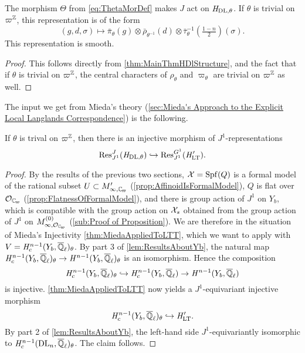 \documentclass[../main.tex]{subfiles}
\begin{document}
\begin{lem}
  The morphism $\Theta$ from \eqref{eq:ThetaMorDef} makes $J$ act on
  ${\mathit H}_{\mathrm{DL},\theta}$. If $\theta$ is trivial on $\varpi^{\mathbb{Z}}$, this
  representation is of the form 
  \begin{equation*}
    (g,d,\sigma) \mapsto \bar \pi_\theta(g) \otimes \bar \rho_{\theta^{-1}}(d)
    \otimes \bar \tau_\theta^{-1}(\tfrac{1-n}2)(\sigma).
  \end{equation*}
  This representation is smooth.
\begin{proof}
  This follows directly from \cref{thm:MainThmHDlStructure}, and the fact that 
  if $\theta$ is trivial on $\varpi^{\mathbb{Z}}$, the central characters of $\rho_\theta$
  and $\varpi_\theta$ are trivial on $\varpi^{\mathbb{Z}}$ as well. 
\end{proof}
\end{lem}

The input we get from Mieda's theory (\cref{sec:Mieda's Approach
to the Explicit Local Langlands Correspondence}) is the
following.
\begin{prop}\label{prop:J1EquivInjMor}
  If $\theta$ is trival on $\varpi^{\mathbb{Z}}$, then there is an injective morphism of
  $J^1$-representations
  \begin{equation*} 
    \operatorname{Res}_{J^1}^J( \mathit H_{\mathrm{DL},\theta} ) \hookrightarrow \operatorname{Res}_{J^1}^{G^1}( \mathit H'_{\mathrm{LT}}).
  \end{equation*}
  \begin{proof}
    By the results of the previous two sections, $\mathcal{X} = \operatorname{Spf}(Q)$ is a formal
    model of the rational subset $U \subset M'_{\infty, \Cp}$
    (\cref{prop:AffinoidIsFormalModel}), 
    $Q$ is flat over $\cO_\Cp$ (\cref{prop:FlatnessOfFormalModel}),
    and there is group action of $J^1$ on $Y_b$, which is compatible with the group
    action on $\mathcal{X}_s$ obtained from the group action of $J^1$ on $M_{\infty,
    \cO_\Cp}^{(0)}$ (\cref{sub:Proof of Proposition}).
    We are therefore in the situation of Mieda's Injectivity 
    \cref{thm:MiedaAppliedToLTT}, 
    which we want to apply with $V = \mathit H^{n-1}_c(Y_b, {\overline {\mathbb{Q}}_\ell})_\theta$. 
    By part 3 of \cref{lem:ResultsAboutYb}, 
    the natural map $\mathit H_c^{n-1}(Y_b, {\overline {\mathbb{Q}}_\ell})_\theta \to \mathit H^{n-1}(Y_b,
    {\overline {\mathbb{Q}}_\ell})_\theta$ is an isomorphism. Hence the composition
    \begin{equation*}
      \mathit H^{n-1}_c(Y_b, {\overline {\mathbb{Q}}_\ell})_\theta \hookrightarrow \mathit H^{n-1}_c(Y_b, {\overline {\mathbb{Q}}_\ell})
      \to \mathit H^{n-1}(Y_b, {\overline {\mathbb{Q}}_\ell})
    \end{equation*}
    is injective. 
    \cref{thm:MiedaAppliedToLTT} now yields a $J^1$-equivariant injective morphism
    \begin{equation*}
      \mathit H_c^{n-1}(Y_b, {\overline {\mathbb{Q}}_\ell})_\theta \hookrightarrow \mathit H'_{\mathrm{LT}}.
    \end{equation*}
    By part 2 of \cref{lem:ResultsAboutYb}, the left-hand side
    $J^1$-equivariantly isomorphic to $\mathit H_c^{n-1}(\mathrm{DL}_n, {\overline {\mathbb{Q}}_\ell})_\theta$. The
    claim follows.
  \end{proof}
\end{prop}
\end{document}
